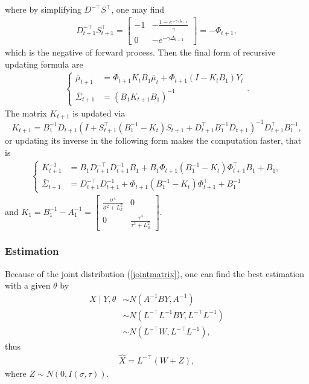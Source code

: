 where by simplifying $D^{-\top}S^\top$, one may find 
\begin{align*}
D_{t+1}^{-\top}S_{t+1}^\top = \begin{bmatrix}
-1 & -\frac{1-e^{-\gamma \Delta_{t+1}}}{\gamma} \\ 0 & - e^{-\gamma \Delta_{t+1}}
\end{bmatrix} = -\Phi_{t+1},
\end{align*}
which is the negative of forward process. Then the final form of recursive updating formula are 
\begin{align}
\begin{cases}
\bar{\mu}_{t+1}&=\Phi_{t+1} K_tB_1\bar{\mu}_t + \Phi_{t+1} (I-K_tB_1)Y_t\\
\bar{\Sigma}_{t+1}&=\left( B_1K_{t+1}B_1  \right)^{-1}
\end{cases}.
\end{align}
The matrix $K_{t+1}$ is updated via 
\begin{equation}
K_{t+1} =B_1^{-1}D_{t+1} (I+ S_{t+1}^\top (B_1^{-1} - K_t)  S_{t+1} +D_{t+1}^\top B_1^{-1}D_{t+1}  )^{-1}  D_{t+1}^\top B_1^{-1},
\end{equation}
or updating its inverse in the following form makes the computation faster, that is 
\begin{align*}
\begin{cases}
K_{t+1}^{-1} &= B_1D_{t+1}^{-\top}D_{t+1}^{-1}B_1 + B_1\Phi_{t+1} (B_1^{-1} - K_t) \Phi_{t+1}^\top B_1+ B_1,\\
\bar{\Sigma}_{t+1}&= D_{t+1}^{-\top}D_{t+1}^{-1}+ \Phi_{t+1} (B_1^{-1} - K_t) \Phi_{t+1}^\top + B_1^{-1}
\end{cases}
\end{align*}
and $K_1 =B_1^{-1} - A_1^{-1} = \begin{bmatrix}
\frac{\sigma^4}{\sigma^2 +L_x^2} & 0 \\ 0 &\frac{\tau^4}{\tau^2 +L_u^2}
\end{bmatrix} $.



\subsubsection*{Estimation}

Because of the joint distribution (\ref{jointmatrix}), one can find the best estimation with a given $\theta$ by
\begin{align*}
X \mid Y,\theta &\sim N \left( A^{-1}BY, A^{-1} \right) \\
&\sim N(L^{-\top}L^{-1}BY,L^{-\top}L^{-1})\\
&\sim N(L^{-\top}W,L^{-\top}L^{-1}),
\end{align*}
thus
\begin{align*}
\hat{X} = L^{-\top}(W+Z),
\end{align*}
where $Z \sim N(0, I(\sigma,\tau))$.



